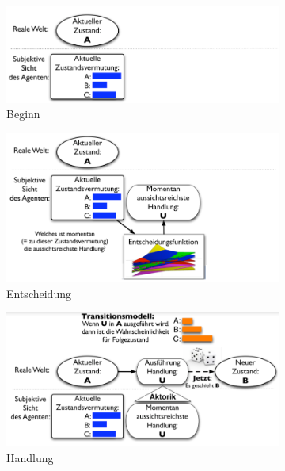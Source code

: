 \begin{figure}[!ht]
	\centering 
	\begin{subfigure}{.5\textwidth}
		\includegraphics[width=\textwidth]{figures/ch08_pom.png}
		\caption{Beginn}
	\end{subfigure}
	\begin{subfigure}{.5\textwidth}
		\includegraphics[width=\textwidth]{figures/ch08_pom1.png}
		\caption{Entscheidung}
	\end{subfigure}
	\begin{subfigure}{.5\textwidth}
		\includegraphics[width=\textwidth]{figures/ch08_pom2.png}
		\caption{Handlung}
	\end{subfigure}
	\begin{subfigure}{.5\textwidth}

\end{subfigure}
\end{figure}
